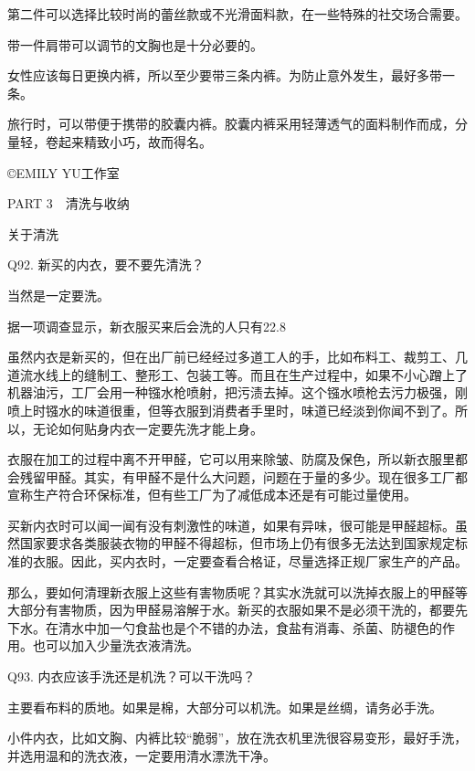 \documentclass[12pt,UTF8]{ctexbook}
\begin{document}
第二件可以选择比较时尚的蕾丝款或不光滑面料款，在一些特殊的社交场合需要。

带一件肩带可以调节的文胸也是十分必要的。


女性应该每日更换内裤，所以至少要带三条内裤。为防止意外发生，最好多带一条。

旅行时，可以带便于携带的胶囊内裤。胶囊内裤采用轻薄透气的面料制作而成，分量轻，卷起来精致小巧，故而得名。





©EMILY YU工作室





PART 3　清洗与收纳





关于清洗


Q92. 新买的内衣，要不要先清洗？


当然是一定要洗。

据一项调查显示，新衣服买来后会洗的人只有22.8%


虽然内衣是新买的，但在出厂前已经经过多道工人的手，比如布料工、裁剪工、几道流水线上的缝制工、整形工、包装工等。而且在生产过程中，如果不小心蹭上了机器油污，工厂会用一种镪水枪喷射，把污渍去掉。这个镪水喷枪去污力极强，刚喷上时镪水的味道很重，但等衣服到消费者手里时，味道已经淡到你闻不到了。所以，无论如何贴身内衣一定要先洗才能上身。

衣服在加工的过程中离不开甲醛，它可以用来除皱、防腐及保色，所以新衣服里都会残留甲醛。其实，有甲醛不是什么大问题，问题在于量的多少。现在很多工厂都宣称生产符合环保标准，但有些工厂为了减低成本还是有可能过量使用。

买新内衣时可以闻一闻有没有刺激性的味道，如果有异味，很可能是甲醛超标。虽然国家要求各类服装衣物的甲醛不得超标，但市场上仍有很多无法达到国家规定标准的衣服。因此，买内衣时，一定要查看合格证，尽量选择正规厂家生产的产品。


那么，要如何清理新衣服上这些有害物质呢？其实水洗就可以洗掉衣服上的甲醛等大部分有害物质，因为甲醛易溶解于水。新买的衣服如果不是必须干洗的，都要先下水。在清水中加一勺食盐也是个不错的办法，食盐有消毒、杀菌、防褪色的作用。也可以加入少量洗衣液清洗。





Q93. 内衣应该手洗还是机洗？可以干洗吗？


主要看布料的质地。如果是棉，大部分可以机洗。如果是丝绸，请务必手洗。

小件内衣，比如文胸、内裤比较“脆弱”，放在洗衣机里洗很容易变形，最好手洗，并选用温和的洗衣液，一定要用清水漂洗干净。
\end{document}
